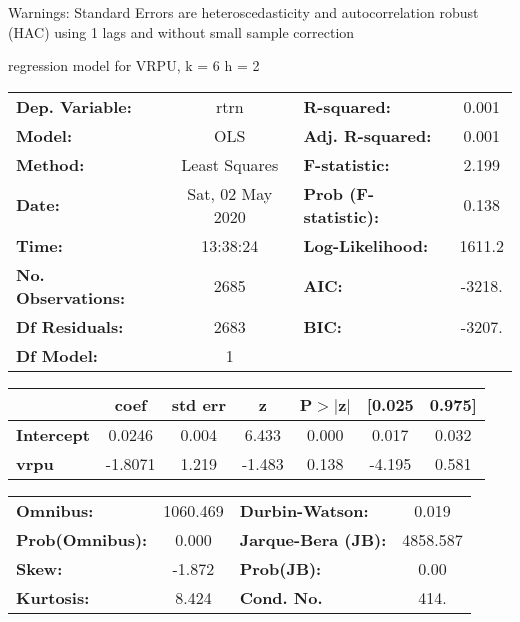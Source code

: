 Warnings: \newline
 [1] Standard Errors are heteroscedasticity and autocorrelation robust (HAC) using 1 lags and without small sample correction\ 

regression model for VRPU, k = 6 h = 2\begin{center}
\begin{tabular}{lclc}
\toprule
\textbf{Dep. Variable:}    &       rtrn       & \textbf{  R-squared:         } &     0.001   \\
\textbf{Model:}            &       OLS        & \textbf{  Adj. R-squared:    } &     0.001   \\
\textbf{Method:}           &  Least Squares   & \textbf{  F-statistic:       } &     2.199   \\
\textbf{Date:}             & Sat, 02 May 2020 & \textbf{  Prob (F-statistic):} &    0.138    \\
\textbf{Time:}             &     13:38:24     & \textbf{  Log-Likelihood:    } &    1611.2   \\
\textbf{No. Observations:} &        2685      & \textbf{  AIC:               } &    -3218.   \\
\textbf{Df Residuals:}     &        2683      & \textbf{  BIC:               } &    -3207.   \\
\textbf{Df Model:}         &           1      & \textbf{                     } &             \\
\bottomrule
\end{tabular}
\begin{tabular}{lcccccc}
                   & \textbf{coef} & \textbf{std err} & \textbf{z} & \textbf{P$> |$z$|$} & \textbf{[0.025} & \textbf{0.975]}  \\
\midrule
\textbf{Intercept} &       0.0246  &        0.004     &     6.433  &         0.000        &        0.017    &        0.032     \\
\textbf{vrpu}      &      -1.8071  &        1.219     &    -1.483  &         0.138        &       -4.195    &        0.581     \\
\bottomrule
\end{tabular}
\begin{tabular}{lclc}
\textbf{Omnibus:}       & 1060.469 & \textbf{  Durbin-Watson:     } &    0.019  \\
\textbf{Prob(Omnibus):} &   0.000  & \textbf{  Jarque-Bera (JB):  } & 4858.587  \\
\textbf{Skew:}          &  -1.872  & \textbf{  Prob(JB):          } &     0.00  \\
\textbf{Kurtosis:}      &   8.424  & \textbf{  Cond. No.          } &     414.  \\
\bottomrule
\end{tabular}
\end{center}

